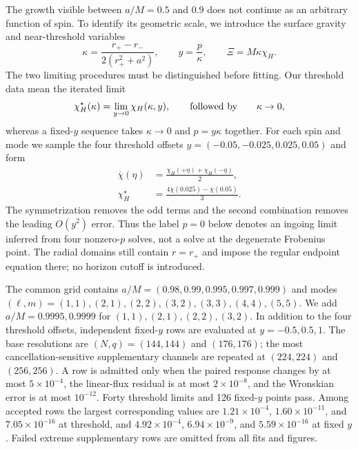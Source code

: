 \documentclass[aps,prd,twocolumn,10pt,nofootinbib,superscriptaddress,floatfix]{revtex4-2}
\begin{document}
The growth visible between $a/M=0.5$ and $0.9$ does not continue as an
arbitrary function of spin.  To identify its geometric scale, we introduce the
surface gravity and near-threshold variables
\begin{equation}
 \kappa=\frac{r_+-r_-}{2(r_+^2+a^2)},\qquad
 y=\frac{p}{\kappa},\qquad \Xi=M\kappa\chi_H .
 \label{eq:near_extremal_variables}
\end{equation}
The two limiting procedures must be distinguished before fitting.  Our
threshold data mean the iterated limit
\begin{equation}
 \chi_H^\star(\kappa)=\lim_{y\to0}\chi_H(\kappa,y),
 \qquad\hbox{followed by}\qquad \kappa\to0,
 \label{eq:iterated_threshold_limit}
\end{equation}
whereas a fixed-$y$ sequence takes $\kappa\to0$ and $p=y\kappa$ together.
For each spin and mode we sample the four threshold offsets
$y=(-0.05,-0.025,0.025,0.05)$ and form
\begin{equation}
 \begin{aligned}
 \overline\chi(\eta)&=\frac{\chi_H(+\eta)+\chi_H(-\eta)}{2},\\
 \chi_H^\star&=\frac{4\overline\chi(0.025)-\overline\chi(0.05)}{3}.
 \end{aligned}
 \label{eq:y_threshold_richardson}
\end{equation}
The symmetrization removes the odd terms and the second combination removes
the leading $O(y^2)$ error.  Thus the label $p=0$ below denotes an ingoing
limit inferred from four nonzero-$p$ solves, not a solve at the degenerate
Frobenius point.  The radial domains still contain $r=r_+$ and impose the
regular endpoint equation there; no horizon cutoff is introduced.

The common grid contains $a/M=(0.98,0.99,0.995,0.997,0.999)$ and modes
$(\ell,m)=(1,1),(2,1),(2,2),(3,2),(3,3),(4,4),(5,5)$.  We add
$a/M=0.9995,0.9999$ for $(1,1),(2,1),(2,2),(3,2)$.  In addition to the four
threshold offsets, independent fixed-$y$ rows are evaluated at
$y=-0.5,0.5,1$.  The base resolutions are $(N,q)=(144,144)$ and $(176,176)$;
the most cancellation-sensitive supplementary channels are repeated at
$(224,224)$ and $(256,256)$.  A row is admitted only when the paired response
changes by at most $5\times10^{-4}$, the linear-flux residual is at most
$2\times10^{-8}$, and the Wronskian error is at most $10^{-12}$.  Forty
threshold limits and 126 fixed-$y$ points pass.  Among accepted rows the
largest corresponding values are $1.21\times10^{-4}$, $1.60\times10^{-11}$,
and $7.05\times10^{-16}$ at threshold, and $4.92\times10^{-4}$,
$6.94\times10^{-9}$, and $5.59\times10^{-16}$ at fixed $y$.  Failed extreme
supplementary rows are omitted from all fits and figures.
\end{document}
